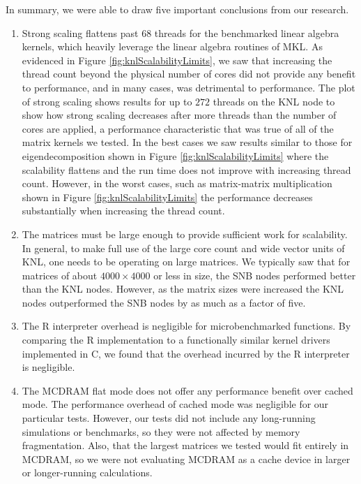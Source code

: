 In summary, we were able to draw five important conclusions from our research.
\begin{enumerate}
\item Strong scaling flattens past 68 threads for the benchmarked linear algebra kernels,
which heavily leverage the linear algebra routines of MKL. As evidenced in Figure
\ref{fig:knlScalabilityLimits}, we saw that increasing the thread count beyond the
physical number of cores did not provide any benefit to performance, and in many cases,
was detrimental to performance. The plot of strong scaling shows results for up to $272$
threads on the KNL node to show how strong scaling decreases after more threads than the
number of cores are applied, a performance characteristic that was true of all of the
matrix kernels we tested. In the best cases we saw results similar to those for
eigendecomposition shown in Figure \ref{fig:knlScalabilityLimits} where the scalability
flattens and the run time does not improve with increasing thread count. However, in the
worst cases, such as matrix-matrix multiplication shown in Figure
\ref{fig:knlScalabilityLimits} the performance decreases substantially when
increasing the thread count.

\item The matrices must be large enough to provide sufficient work for scalability. In
general, to make full use of the large core count and wide vector units of KNL, one needs
to be operating on large matrices. We typically saw that for matrices of about $4000\times
4000$ or less in size, the SNB nodes performed better than the KNL nodes. However, as the
matrix sizes were increased the KNL nodes outperformed the SNB nodes by as much as a
factor of five.

\item The R interpreter overhead is negligible for microbenchmarked functions. By
comparing the R implementation to a functionally similar kernel drivers implemented in C,
we found that the overhead incurred by the R interpreter is negligible.

\item The MCDRAM flat mode does not offer any performance benefit over cached mode. The
performance overhead of cached mode was negligible for our particular tests. However, our
tests did not include any long-running simulations or benchmarks, so they were not
affected by memory fragmentation. Also, that the largest matrices we
tested would fit entirely in MCDRAM, so we were not evaluating MCDRAM as a cache device in
larger or longer-running calculations.


\end{enumerate}

